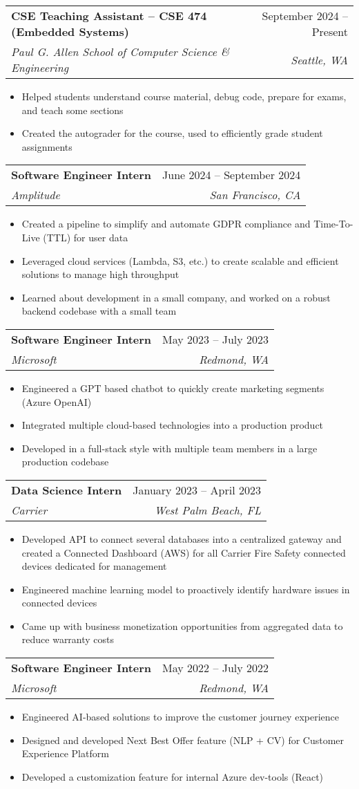 \documentclass[letterpaper,11pt]{article}
\makeatletter
\newcommand{\resumeItem}[1]{
  \item\small{
    {#1 \vspace{-2pt}}
  }
}
\newcommand{\resumeSubheading}[4]{
  \vspace{-2pt}\item
    \begin{tabular*}{0.97\textwidth}[t]{l@{\extracolsep{\fill}}r}
      \textbf{#1} & #2 \\
      \textit{\small#3} & \textit{\small #4} \\
    \end{tabular*}\vspace{-7pt}
}
\newcommand{\resumeItemListStart}{\begin{itemize}}
\newcommand{\resumeItemListEnd}{\end{itemize}\vspace{-5pt}}
\makeatother
\begin{document}
  \resumeSubheading
    {CSE Teaching Assistant -- CSE 474 (Embedded Systems)}{September 2024 -- Present}
    {Paul G. Allen School of Computer Science \& Engineering}{Seattle, WA}
    \resumeItemListStart
      \resumeItem{Helped students understand course material, debug code, prepare for exams, and teach some sections}
      \resumeItem{Created the autograder for the course, used to efficiently grade student assignments}
    \resumeItemListEnd

    \resumeSubheading
      {Software Engineer Intern}{June 2024 -- September 2024}
      {Amplitude}{San Francisco, CA}
      \resumeItemListStart
        \resumeItem{Created a pipeline to simplify and automate GDPR compliance and Time-To-Live (TTL) for user data}
        \resumeItem{Leveraged cloud services (Lambda, S3, etc.) to create scalable and efficient solutions to manage high throughput}
        \resumeItem{Learned about development in a small company, and worked on a robust backend codebase with a small team}
      \resumeItemListEnd
      
    \resumeSubheading
      {Software Engineer Intern}{May 2023 -- July 2023}
      {Microsoft}{Redmond, WA}
      \resumeItemListStart
        \resumeItem{Engineered a GPT based chatbot to quickly create marketing segments (Azure OpenAI)}
        \resumeItem{Integrated multiple cloud-based technologies into a production product}
        \resumeItem{Developed in a full-stack style with multiple team members in a large production codebase}
      \resumeItemListEnd
    
    \resumeSubheading
      {Data Science Intern}{January 2023 -- April 2023}
      {Carrier}{West Palm Beach, FL}
      \resumeItemListStart
        \resumeItem{Developed API to connect several databases into a centralized gateway and created a Connected Dashboard (AWS) for all Carrier Fire Safety connected devices dedicated for management}
        \resumeItem{Engineered machine learning model to proactively identify hardware issues in connected devices}
        \resumeItem{Came up with business monetization opportunities from aggregated data to reduce warranty costs}
      \resumeItemListEnd
        
    \resumeSubheading
      {Software Engineer Intern}{May 2022 -- July 2022}
      {Microsoft}{Redmond, WA}
      \resumeItemListStart
        \resumeItem{Engineered AI-based solutions to improve the customer journey experience}
        \resumeItem{Designed and developed Next Best Offer feature (NLP + CV) for Customer Experience Platform}
        \resumeItem{Developed a customization feature for internal Azure dev-tools (React)}
    \resumeItemListEnd
    
\end{document}
